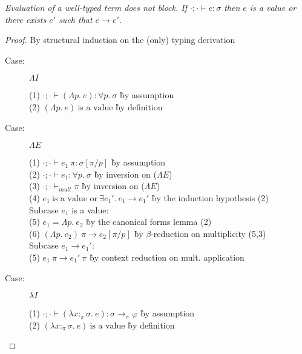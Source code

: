 
\begin{theorem}[Progress]
\emph{Evaluation of a well-typed term does not block. If $\cdot; \cdot \vdash e :
  \sigma$ then $e$ is a value or there exists $e'$ such that $e \longrightarrow e'$.}
\end{theorem}

\begin{proof}
By structural induction on the (only) typing derivation

\begin{description}

\item[Case:] $\Lambda I$
\begin{tabbing}
(1) $\cdot; \cdot \vdash (\Lambda p.~e) : \forall p.~\sigma$ \` by assumption \\
(2) $(\Lambda p.~e)~\textrm{is a value}$ \` by definition \\
\end{tabbing}

\item[Case:] $\Lambda E$
\begin{tabbing}
(1) $\cdot; \cdot \vdash e_1~\pi : \sigma[\pi/p]$ \` by assumption \\
(2) $\cdot; \cdot \vdash e_1 : \forall p.~\sigma$ \` by inversion on ($\Lambda E$) \\
(3) $\cdot; \cdot \vdash_{mult} \pi$ \` by inversion on ($\Lambda E$) \\
(4) $e_1~\textrm{is a value or}~\exists e_1'.~e_1 \longrightarrow e_1'$ \` by the induction hypothesis (2) \\
\textrm{Subcase $e_1$ is a value:}\\
(5) $e_1 = \Lambda p.~e_2$ \` by the canonical forms lemma (2) \\
(6) $(\Lambda p.~e_2)~\pi \longrightarrow e_2[\pi/p]$ \` by $\beta$-reduction on multiplicity (5,3) \\
\textrm{Subcase $e_1 \longrightarrow e_1'$:}\\
(5) $e_1~\pi \longrightarrow e_1'~\pi$ \` by context reduction on mult. application \\
\end{tabbing}

\item[Case:] $\lambda I$
\begin{tabbing}
(1) $\cdot; \cdot \vdash (\lambda x{:}_\pi\sigma.~e) : \sigma\to_\pi\varphi$ \` by assumption \\
(2) $(\lambda x{:}_\pi\sigma.~e)~\textrm{is a value}$ \` by definition \\
\end{tabbing}


\end{description}
\end{proof}
